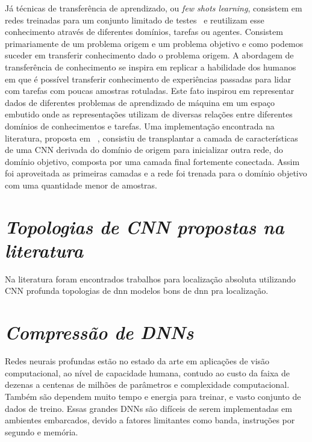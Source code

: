 Já técnicas de transferência de aprendizado, ou \textit{few shots learning}, consistem em redes treinadas para um conjunto limitado de testes~\cite{rostami2019learning}
e reutilizam esse conhecimento através de diferentes domínios, tarefas ou agentes. Consistem primariamente de um problema origem e um problema objetivo e como podemos suceder em transferir conhecimento dado o problema origem. A abordagem de transferência de conhecimento se inspira em replicar a habilidade dos humanos em que é possível transferir conhecimento de experiências passadas para lidar com tarefas com poucas amostras rotuladas. Este fato inspirou em representar dados de diferentes problemas de aprendizado de máquina em um espaço embutido onde as representações utilizam de diversas relações entre diferentes domínios de conhecimentos e tarefas. Uma implementação encontrada na literatura, proposta em ~\cite{DBLP:journals/corr/abs-1811-04863}, consistiu de transplantar a camada de características de uma CNN derivada do domínio de origem para inicializar outra rede, do domínio objetivo, composta por uma camada final fortemente conectada. Assim foi aproveitada as primeiras camadas e a rede foi trenada para o domínio objetivo com uma quantidade menor de amostras.

\section{\textit{Topologias de CNN propostas na literatura}}\label{sec:Cap2_MR}

 Na literatura foram encontrados trabalhos para localização absoluta utilizando CNN profunda
topologias de dnn  modelos bons de dnn pra localização. 





\section{\textit{Compressão de DNNs}}\label{sec:Cap2_MR}


Redes neurais profundas estão no estado da arte em aplicações de visão computacional, ao nível de capacidade humana, contudo ao custo da faixa de dezenas a centenas de milhões de parâmetros e complexidade computacional. Também são dependem muito tempo e energia para treinar, e vasto conjunto de dados de treino. Essas grandes DNNs são difíceis de serem implementadas em ambientes embarcados, devido a fatores limitantes como banda, instruções por segundo e memória. 

